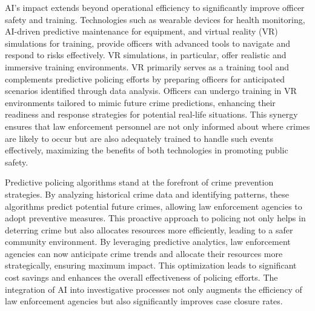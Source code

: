 \documentclass[man, noextraspace]{apa7} %
\begin{document}
AI's impact extends beyond operational efficiency to significantly improve officer safety and training. Technologies such as wearable devices for health monitoring, AI-driven predictive maintenance for equipment, and virtual reality (VR) simulations for training, provide officers with advanced tools to navigate and respond to risks effectively. VR simulations, in particular, offer realistic and immersive training environments.
 VR primarily serves as a training tool and complements predictive policing efforts by preparing officers for anticipated scenarios identified through data analysis. Officers can undergo training in VR environments tailored to mimic future crime predictions, enhancing their readiness and response strategies for potential real-life situations. This synergy ensures that law enforcement personnel are not only informed about where crimes are likely to occur but are also adequately trained to handle such events effectively, maximizing the benefits of both technologies in promoting public safety.

Predictive policing algorithms stand at the forefront of crime prevention strategies. By analyzing historical crime data and identifying patterns, these algorithms predict potential future crimes, allowing law enforcement agencies to adopt preventive measures. This proactive approach to policing not only helps in deterring crime but also allocates resources more efficiently, leading to a safer community environment. By leveraging predictive analytics, law enforcement agencies can now anticipate crime trends and allocate their resources more strategically, ensuring maximum impact. This optimization leads to significant cost savings and enhances the overall effectiveness of policing efforts. The integration of AI into investigative processes not only augments the efficiency of law enforcement agencies but also significantly improves case closure rates.\vspace{1cm}


\end{document}
